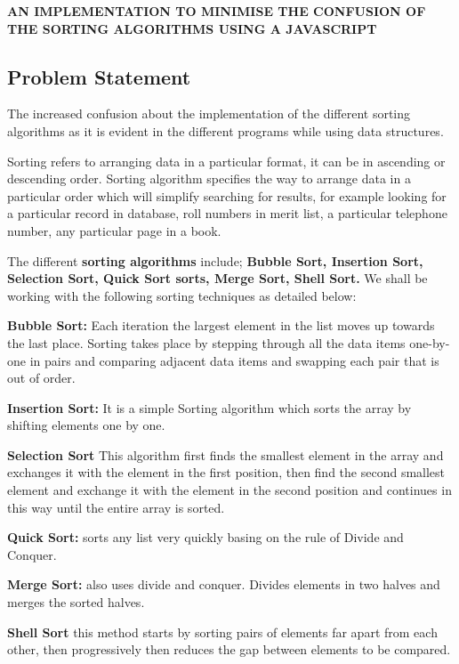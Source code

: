 \documentclass[12pt]{article}
\begin{document}
\large{\textbf{ AN IMPLEMENTATION TO MINIMISE THE CONFUSION OF THE SORTING ALGORITHMS USING A JAVASCRIPT\\ } }

\subsection{Problem Statement}
 The increased confusion about the implementation of the different sorting algorithms as it is evident in the different programs while using data structures.
 
 
 Sorting refers to arranging data in a particular format, it can be in ascending or descending order. Sorting algorithm specifies the way to arrange data in a particular order which will simplify searching for results, for example looking for a particular record in database, roll numbers in merit list, a particular telephone number, any particular page in a book.
 
 
 The different \textbf{sorting algorithms} include; \textbf{Bubble Sort, Insertion Sort, Selection Sort, Quick Sort sorts, Merge Sort, Shell Sort.} We shall be working with the following sorting techniques as detailed below:
 
 
 \textbf{Bubble Sort:} Each iteration the largest element in the list moves up towards the last place. Sorting takes place by stepping through all the data items one-by-one in pairs and comparing adjacent data items and swapping each pair that is out of order.
 
 
 \textbf{Insertion Sort:} It is a simple Sorting algorithm which sorts the array by shifting elements one by one.
 
 
 \textbf{Selection Sort} This algorithm first finds the smallest element in the array and exchanges it with the element in the first position, then find the second smallest element and exchange it with the element in the second position and continues in this way until the entire array is sorted.


 \textbf{Quick Sort:} sorts any list very quickly basing on the rule of Divide and Conquer.
 
 
 \textbf{Merge Sort:} also uses divide and conquer. Divides elements in two halves and merges the sorted halves.
 
 
 
 
 \textbf{Shell Sort} this method starts by sorting pairs of elements far apart from each other, then progressively then reduces the gap between elements to be compared.     
\end{document}
